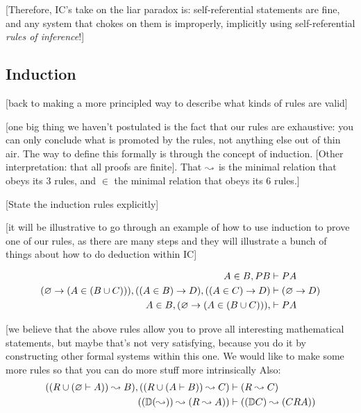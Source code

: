 \documentclass{article}
\begin{document}
  [Therefore, IC's take on the liar paradox is: self-referential statements are fine, and any system that chokes on them is improperly, implicitly using self-referential \emph{rules of inference}!]
  
  \subsection{Induction}
  
  [back to making a more principled way to describe what kinds of rules are valid]
  
  [one big thing we haven't postulated is the fact that our rules are exhaustive: you can only conclude what is promoted by the rules, not anything else out of thin air. The way to define this formally is through the concept of induction. [Other interpretation: that all proofs are finite]. That $\leadsto$ is the minimal relation that obeys its 3 rules, and $\in$ the minimal relation that obeys its 6 rules.]
  
  [State the induction rules explicitly]
  
  [it will be illustrative to go through an example of how to use induction to prove one of our rules, as there are many steps and they will illustrate a bunch of things about how to do deduction within IC]
  
  \begin{align*}
    A \in {B}, PB &\vdash P{A}\\
    (\varnothing \to (A \in (B \cup C))), ((A \in B) \to D), ((A \in C) \to D) &\vdash (\varnothing \to D) \\
    A \in B,
    (\varnothing \to (A \in (B \cup C))), 
     &\vdash P{A}\\
  \end{align*}
  
  
  \iffalse
  
  [we believe that the above rules allow you to prove all interesting mathematical statements, but maybe that's not very satisfying, because you do it by constructing other formal systems within this one. We would like to make some more rules so that you can do more stuff more intrinsically
  Also:
  \begin{align*}
    ((R \cup (\varnothing \vdash A)) \leadsto B), ((R \cup (A \vdash B)) \leadsto C) &\vdash (R \leadsto C) \\
    ((\mathbb{D} (\leadsto)) \leadsto (R \leadsto A)) &\vdash ((\mathbb{D} C) \leadsto (C R A)) \\
  \end{align*}
  
\end{document}
